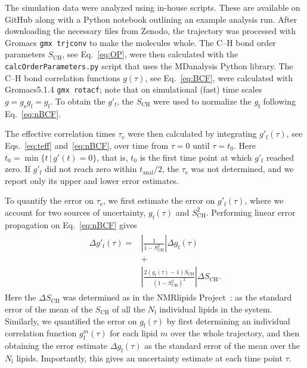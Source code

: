 \documentclass[journal=jpcbfk,manuscript=article,layout=twocolumn]{achemso}
\begin{document}
The simulation data were analyzed using in-house scripts. These are available on GitHub \cite{citehere} along with a Python notebook outlining an example analysis run.
After downloading the necessary files from Zenodo, the trajectory was processed with Gromacs \texttt{gmx trjconv} to make the molecules whole.
The C--H bond order parameters  $S_\mathrm{CH}$, see Eq.~\eqref{eq:OP}, were then calculated with the \texttt{calcOrderParameters.py}\cite{citegithubhere} script that uses the MDanalysis\cite{XXX} Python library.
%
The \mbox{C--H} bond correlation functions
$g(\tau)$, see Eq.~\eqref{eq:BCF},
were calculated with Gromacs5.1.4\cite{XXX} \texttt{gmx rotacf};
note that on simulational (fast) time scales $g = g_\mathrm{s} g_\mathrm{f}= g_\mathrm{f}$.
%
To obtain the $g'_\mathrm f$,
the $S_\mathrm{CH}$ were used to
normalize the $g_\mathrm f$ following Eq.~\eqref{eq:nBCF}.

The effective correlation times $\tau_\mathrm e$ were then calculated by integrating $g'_\mathrm f(\tau)$,
see Eqs.~\eqref{eq:teff} and~\eqref{eq:nBCF},
over time from $\tau=0$ until $\tau = t_0$.
Here
$t_0 = \min
	\{
	t\,|\,g'(t)=0
	\}
$,
that is, $t_\mathrm 0$ is the first time point at which $g'_\mathrm f$ reached zero.
%
If $g'_\mathrm f$ did not reach zero within 
$t_\mathrm{anal}/2$, the 
$\tau_\mathrm e$ was not determined,
and we report only its upper and lower error estimates.

To quantify the error on $\tau_\mathrm e$, we first estimate the error on $g'_\mathrm f(\tau)$,%
where we account for two sources of uncertainty, $g_{\mathrm{f}}(\tau)$ and $S^2_\mathrm{CH}$.
%
Performing linear error propagation on Eq.~\eqref{eq:nBCF} gives
\begin{align}
\begin{split}
\label{eq:error}
\Delta g'_{\mathrm{f}}(\tau)
=
&\left|
	\frac{1}{1-S^2_\mathrm{CH}}
\right|
\Delta g_{\mathrm{f}}(\tau)\\
&+\\
&\left|
	\frac{2\left(g_\mathrm{f}(\tau)-1\right)S_\mathrm{CH}}{\left(1-S^2_\mathrm{CH}\right)^2}
\right|
\Delta S_\mathrm{CH}.
\end{split}
\end{align}
Here the $\Delta S_\mathrm{CH}$ was determined as in the NMR\-lipids Project~\cite{botan15}:
as the standard error of the mean of the $S_\mathrm{CH}$ of all the $N_\mathrm l$ individual lipids in the system.
%
Similarly, we quantified the error on $g_{\mathrm{f}}(\tau)$
by first determining an individual correlation function $g^m_{\mathrm{f}}(\tau)$ for each lipid $m$
over the whole trajectory, and then obtaining the error estimate
$\Delta g_{\mathrm{f}}(\tau)$
as the standard error of the mean over the $N_\mathrm l$ lipids.
%
Importantly, this gives an uncertainty estimate at each time point $\tau$.
\end{document}
